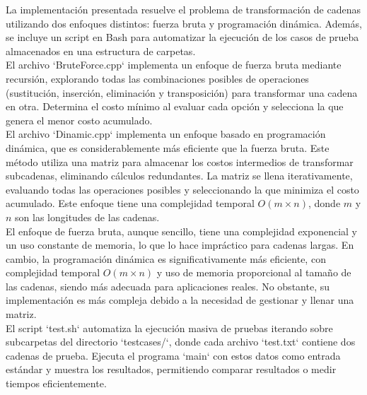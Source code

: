La implementación presentada resuelve el problema de transformación de cadenas utilizando dos enfoques distintos: fuerza bruta y programación dinámica. Además, se incluye un script en Bash para automatizar la ejecución de los casos de prueba almacenados en una estructura de carpetas.\\

El archivo `BruteForce.cpp` implementa un enfoque de fuerza bruta mediante recursión, explorando todas las combinaciones posibles de operaciones (sustitución, inserción, eliminación y transposición) para transformar una cadena en otra. Determina el costo mínimo al evaluar cada opción y selecciona la que genera el menor costo acumulado.\\

El archivo `Dinamic.cpp` implementa un enfoque basado en programación dinámica, que es considerablemente más eficiente que la fuerza bruta. Este método utiliza una matriz para almacenar los costos intermedios de transformar subcadenas, eliminando cálculos redundantes. La matriz se llena iterativamente, evaluando todas las operaciones posibles y seleccionando la que minimiza el costo acumulado. Este enfoque tiene una complejidad temporal \(O(m \times n)\), donde \(m\) y \(n\) son las longitudes de las cadenas.\\

El enfoque de fuerza bruta, aunque sencillo, tiene una complejidad exponencial y un uso constante de memoria, lo que lo hace impráctico para cadenas largas. En cambio, la programación dinámica es significativamente más eficiente, con complejidad temporal \(O(m \times n)\) y uso de memoria proporcional al tamaño de las cadenas, siendo más adecuada para aplicaciones reales. No obstante, su implementación es más compleja debido a la necesidad de gestionar y llenar una matriz.\\

El script `test.sh` automatiza la ejecución masiva de pruebas iterando sobre subcarpetas del directorio `testcases/`, donde cada archivo `test.txt` contiene dos cadenas de prueba. Ejecuta el programa `main` con estos datos como entrada estándar y muestra los resultados, permitiendo comparar resultados o medir tiempos eficientemente.